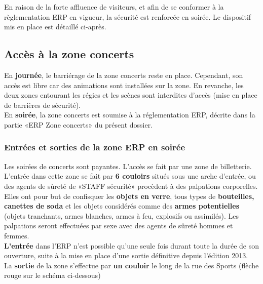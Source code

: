 \documentclass[hidelinks, paper=a4, fontsize=13pt]{report}
\begin{document}
En raison de la forte affluence de visiteurs, et afin de se conformer à la règlementation ERP en vigueur, la sécurité est renforcée en soirée. Le dispositif mis en place est détaillé ci-après.

\subsection{Accès à la zone concerts}
\label{sec:acces_zc_soiree}

En \textbf{journée}, le barriérage de la zone concerts reste en place. Cependant, son accès est libre car des animations sont installées sur la zone. En revanche, les deux zones entourant les régies et les scènes sont interdites d’accès (mise en place de barrières de sécurité).\\

En \textbf{soirée}, la zone concerts est soumise à la réglementation ERP, décrite dans la partie «ERP Zone concerts» du présent dossier. 

\subsubsection{Entrées et sorties de la zone ERP en soirée}

Les soirées de concerts sont payantes. L’accès se fait par une zone de billetterie. L’entrée dans cette zone se fait par \textbf{6 couloirs} situés sous une arche d’entrée, ou des agents de sûreté de «STAFF sécurité» procèdent à des palpations corporelles. \\

Elles ont pour but de confisquer les \textbf{objets en verre}, tous types de \textbf{bouteilles, canettes de soda} et les objets considérés comme des \textbf{armes potentielles} (objets tranchants, armes blanches, armes à feu, explosifs ou assimilés). 
Les palpations seront effectuées par sexe avec des agents de sûreté hommes et femmes.\\

\textbf{L’entrée} dans l’ERP n’est possible qu’une seule fois durant toute la durée de son ouverture, suite à la mise en place d’une sortie définitive depuis l’édition 2013. \\
La \textbf{sortie} de la zone s’effectue par \textbf{un couloir} le long de la rue des Sports (flèche rouge sur le schéma ci-dessous)
\end{document}
